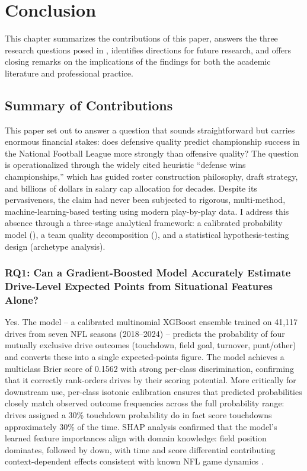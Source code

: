 \chapter{Conclusion}
\label{ch:conclusion}

This chapter summarizes the contributions of this paper, answers the three research questions posed in , identifies directions for future research, and offers closing remarks on the implications of the findings for both the academic literature and professional practice.

\section{Summary of Contributions}
\label{sec:contributions-summary}

This paper set out to answer a question that sounds straightforward but carries enormous financial stakes: does defensive quality predict championship success in the National Football League more strongly than offensive quality? The question is operationalized through the widely cited heuristic ``defense wins championships,'' which has guided roster construction philosophy, draft strategy, and billions of dollars in salary cap allocation for decades. Despite its pervasiveness, the claim had never been subjected to rigorous, multi-method, machine-learning-based testing using modern play-by-play data. I address this absence through a three-stage analytical framework: a calibrated probability model (\xscore{}), a team quality decomposition (\gds{}), and a statistical hypothesis-testing design (archetype analysis).

\subsection{RQ1: Can a Gradient-Boosted Model Accurately Estimate Drive-Level Expected Points from Situational Features Alone?}
\label{sec:rq1-answer}

Yes. The \xscore{} model  -- a calibrated multinomial XGBoost ensemble trained on 41{,}117 drives from seven NFL seasons (2018--2024)  -- predicts the probability of four mutually exclusive drive outcomes (touchdown, field goal, turnover, punt/other) and converts these into a single expected-points figure. The model achieves a multiclass Brier score of 0.1562 with strong per-class discrimination, confirming that it correctly rank-orders drives by their scoring potential. More critically for downstream use, per-class isotonic calibration ensures that predicted probabilities closely match observed outcome frequencies across the full probability range: drives assigned a 30\% touchdown probability do in fact score touchdowns approximately 30\% of the time. SHAP analysis confirmed that the model's learned feature importances align with domain knowledge: field position dominates, followed by down, with time and score differential contributing context-dependent effects consistent with known NFL game dynamics \parencite{lundberg2017shap}.

